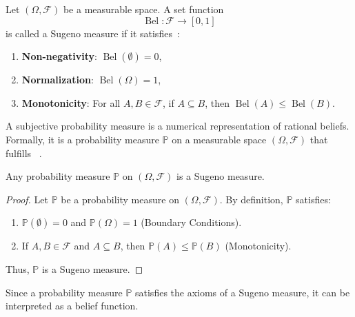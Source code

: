 \begin{definition}
	\label{def:sugeno_measure}
	Let $(\Omega, \mathcal{F})$ be a measurable space. A set function
	\begin{equation}
		\operatorname{Bel}: \mathcal{F} \to [0, 1]
	\end{equation}
	is called a Sugeno measure if it satisfies~\cite{shafer1987}:
	\begin{enumerate}
		\item \textbf{Non-negativity}: $\operatorname{Bel}(\emptyset) = 0$,
		\item \textbf{Normalization}: $\operatorname{Bel}(\Omega) = 1$,
		\item \textbf{Monotonicity}: For all $A, B \in \mathcal{F}$, if $A \subseteq B$, then $\operatorname{Bel}(A) \leq \operatorname{Bel}(B)$.
	\end{enumerate}
\end{definition}

\begin{definition}
	\label{def:subjective_probability}
	A subjective probability measure is a numerical representation of rational beliefs. Formally, it is a probability measure $\mathbb{P}$ on a measurable space $(\Omega, \mathcal{F})$ that fulfills  ~\cite{shafer1987,hoff2009first}.
\end{definition}

\begin{theorem}
	Any probability measure $\mathbb{P}$ on $(\Omega, \mathcal{F})$ is a Sugeno measure.
\end{theorem}
\begin{proof}
	Let $\mathbb{P}$ be a probability measure on $(\Omega, \mathcal{F})$. By definition, $\mathbb{P}$ satisfies:
	\begin{enumerate}
		\item $\mathbb{P}(\emptyset) = 0$ and $\mathbb{P}(\Omega) = 1$ (Boundary Conditions).
		\item If $A, B \in \mathcal{F}$ and $A \subseteq B$, then $\mathbb{P}(A) \leq \mathbb{P}(B)$ (Monotonicity).
	\end{enumerate}
	Thus, $\mathbb{P}$ is a Sugeno measure.
\end{proof}

\begin{corollary}
	Since a probability measure $\mathbb{P}$ satisfies the axioms of a Sugeno measure, it can be interpreted as a belief function.
\end{corollary}



